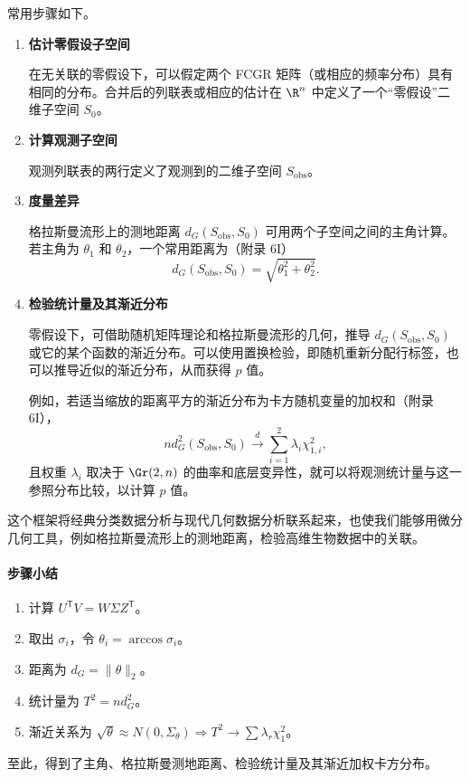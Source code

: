 常用步骤如下。
\begin{enumerate}[label=步骤 \arabic*.,leftmargin=*]
  \item \textbf{估计零假设子空间}\par
  在无关联的零假设下，可以假定两个 FCGR 矩阵（或相应的频率分布）具有相同的分布。合并后的列联表或相应的估计在 $\R^n$ 中定义了一个“零假设”二维子空间 $S_0$。

  \item \textbf{计算观测子空间}\par
  观测列联表的两行定义了观测到的二维子空间 $S_{\mathrm{obs}}$。

  \item \textbf{度量差异}\par
  格拉斯曼流形上的测地距离 $d_G(S_{\mathrm{obs}},S_0)$ 可用两个子空间之间的主角计算。若主角为 $\theta_1$ 和 $\theta_2$，一个常用距离为（附录 6I）
  \[
    d_G(S_{\mathrm{obs}},S_0)=\sqrt{\theta_1^2+\theta_2^2}.
  \]

  \item \textbf{检验统计量及其渐近分布}\par
  零假设下，可借助随机矩阵理论和格拉斯曼流形的几何，推导 $d_G(S_{\mathrm{obs}},S_0)$ 或它的某个函数的渐近分布。可以使用置换检验，即随机重新分配行标签，也可以推导近似的渐近分布，从而获得 $p$ 值。

  例如，若适当缩放的距离平方的渐近分布为卡方随机变量的加权和（附录 6I），
  \[
    nd_G^2(S_{\mathrm{obs}},S_0)\xrightarrow{d}\sum_{i=1}^2\lambda_i\chi_{1,i}^2,
  \]
  且权重 $\lambda_i$ 取决于 $\Gr(2,n)$ 的曲率和底层变异性，就可以将观测统计量与这一参照分布比较，以计算 $p$ 值。
\end{enumerate}

这个框架将经典分类数据分析与现代几何数据分析联系起来，也使我们能够用微分几何工具，例如格拉斯曼流形上的测地距离，检验高维生物数据中的关联。

\paragraph{步骤小结}

\begin{enumerate}
  \item 计算 $U^{\mathsf T}V=W\Sigma Z^{\mathsf T}$。
  \item 取出 $\sigma_i$，令 $\theta_i=\arccos\sigma_i$。
  \item 距离为 $d_G=\lVert\theta\rVert_2$。
  \item 统计量为 $T^2=nd_G^2$。
  \item 渐近关系为 $\sqrt{\theta}\approx N(0,\Sigma_\theta)\Rightarrow T^2\to\sum\lambda_r\chi_1^2$。
\end{enumerate}
至此，得到了主角、格拉斯曼测地距离、检验统计量及其渐近加权卡方分布。

